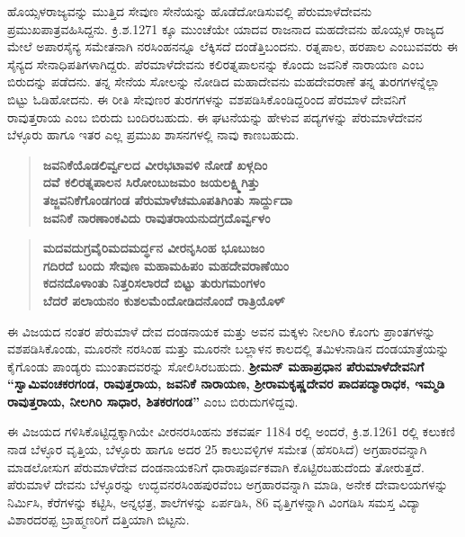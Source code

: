 ಹೊಯ್ಸಳರಾಜ್ಯವನ್ನು ಮುತ್ತಿದ ಸೇವುಣ ಸೇನೆಯನ್ನು ಹೊಡೆದೋಡಿಸುವಲ್ಲಿ ಪೆರುಮಾಳೆದೇವನು ಪ್ರಮುಖಪಾತ್ರ\-ವಹಿಸಿದ್ದನು. ಕ್ರಿ.ಶ.1271 ಕ್ಕೂ ಮುಂಚೆಯೇ ಯಾದವ ರಾಜನಾದ ಮಹದೇವನು ಹೊಯ್ಸಳ ರಾಜ್ಯದ ಮೇಲೆ ಅಪಾರಸೈನ್ಯ ಸಮೇತನಾಗಿ ನರಸಿಂಹನನ್ನೂ ಲೆಕ್ಕಿಸದೆ ದಂಡೆತ್ತಿಬಂದನು. ರತ್ನಪಾಲ, ಹರಪಾಲ ಎಂಬುವವರು ಈ ಸೈನ್ಯದ ಸೇನಾಧಿಪತಿ\-ಗಳಾಗಿದ್ದರು. ಪೆರಮಾಳೆದೇವನು ಕಲಿರತ್ನಪಾಲನನ್ನು ಕೊಂದು ಜವನಿಕೆ ನಾರಾಯಣ ಎಂಬ ಬಿರುದನ್ನು ಪಡೆದನು. ತನ್ನ ಸೇನೆಯ ಸೋಲನ್ನು ನೋಡಿದ ಮಹಾದೇವನು ಮಹದೇವರಾಣೆ ತನ್ನ ತುರಗಗಳನ್ನೆಲ್ಲಾ ಬಿಟ್ಟು ಓಡಿಹೋದನು. ಈ ರೀತಿ ಸೇವುಣರ ತುರಗಗಳನ್ನು ವಶಪಡಿಸಿಕೊಂಡಿದ್ದರಿಂದ ಪೆರಮಾಳೆ ದೇವನಿಗೆ ರಾವುತ್ತರಾಯ ಎಂಬ ಬಿರುದು ಬಂದಿರಬಹುದು. ಈ ಘಟನೆಯನ್ನು ಹೇಳುವ ಪದ್ಯಗಳನ್ನು ಪೆರುಮಾಳೆದೇವನ ಬೆಳ್ಳೂರು ಹಾಗೂ ಇತರ ಎಲ್ಲ ಪ್ರಮುಖ ಶಾಸನಗಳಲ್ಲಿ ನಾವು ಕಾಣಬಹುದು.

\begin{verse}
\textbf{ಜವನಿಕೆಯೊಡಲಿರ್ವ್ವಲದ ವೀರಭಟಾವಳಿ ನೋಡೆ ಖಳ್ಗದಿಂ} \\\textbf{ದವೆ ಕಲಿರತ್ನಪಾಲನ ಸಿರೋಂಬುಜಮಂ ಜಯಲಕ್ಷ್ಮಿಗಿತ್ತು} \\\textbf{ತಜ್ಜವನಿಕೆಗೊಂಡಗಂಡ ಪೆರುಮಾಳೆಚಮೂಪತಿಗಿಂತು ಸಾರ್ದ್ದುದಾ} \\\textbf{ಜವನಿಕೆ ನಾರಣಾಂಕವಿದು ರಾವುತರಾಯನುದಗ್ರದೊರ್ವ್ವಳಂ}
\end{verse}

\begin{verse}
\textbf{ಮದವದುಗ್ರವೈರಿಮದಮರ್ದ್ಧನ ವೀರನೃಸಿಂಹ ಭೂಬುಜಂ} \\\textbf{ಗದಿರದೆ ಬಂದು ಸೇವುಣ ಮಹಾಮಹಿಪಂ ಮಹದೇವರಾಣೆಯಿಂ} \\\textbf{ಕದನದೊಳಾಂತು ನಿತ್ತರಿಸಲಾರದೆ ಬಿಟ್ಟು ತುರುಗಮಂಗಳಂ} \\\textbf{ಬೆದರೆ ಪಲಾಯನಂ ಕುಶಲಮೆಂದೋಡಿದನೊಂದೆ ರಾತ್ರಿಯೊಳ್​}
\end{verse}

ಈ ವಿಜಯದ ನಂತರ ಪೆರುಮಾಳೆ ದೇವ ದಂಡನಾಯಕ ಮತ್ತು ಅವನ ಮಕ್ಕಳು ನೀಲಗಿರಿ ಕೊಂಗು ಪ್ರಾಂತಗಳನ್ನು ವಶಪಡಿಸಿಕೊಂಡು, ಮೂರನೇ ನರಸಿಂಹ ಮತ್ತು ಮೂರನೇ ಬಲ್ಲಾಳನ ಕಾಲದಲ್ಲಿ ತಮಿಳುನಾಡಿನ ದಂಡಯಾತ್ರೆಯನ್ನು ಕೈಗೊಂಡು ಪಾಂಡ್ಯರು ಮುಂತಾದವರನ್ನು ಸೋಲಿಸಿರಬಹುದು. \textbf{ಶ‍್ರೀಮನ್​ ಮಹಾಪ್ರಧಾನ ಪೆರುಮಾಳೆದೇವನಿಗೆ “ಸ್ವಾಮಿವಂಚಕರಗಂಡ, ರಾವುತ್ತರಾಯ, ಜವನಿಕೆ ನಾರಾಯಣ, ಶ‍್ರೀರಾಮಕೃಷ್ಣದೇವರ ಪಾದಪದ್ಮಾರಾಧಕ, ಇಮ್ಮಡಿ ರಾವುತ್ತರಾಯ, ನೀಲಗಿರಿ ಸಾಧಾರ, ಶಿತಕರಗಂಡ”} ಎಂಬ ಬಿರುದುಗಳಿದ್ದವು.

ಈ ವಿಜಯದ ಗಳಿಸಿಕೊಟ್ಟಿದ್ದಕ್ಕಾಗಿಯೇ ವೀರನರಸಿಂಹನು ಶಕವರ್ಷ 1184 ರಲ್ಲಿ ಅಂದರೆ, ಕ್ರಿ.ಶ.1261 ರಲ್ಲಿ ಕಲುಕಣಿ ನಾಡ ಬೆಳ್ಳೂರ ವೃತ್ತಿಯ, ಬೆಳ್ಳೂರು ಹಾಗೂ ಅದರ 25 ಕಾಲುವಳ್ಳಿಗಳ ಸಮೇತ (ಹೆಸರಿಸಿದೆ) ಅಗ್ರಹಾರವನ್ನಾಗಿ ಮಾಡಲೋಸುಗ ಪೆರುಮಾಳೆದೇವ ದಂಡನಾಯಕನಿಗೆ ಧಾರಾಪೂರ್ವಕವಾಗಿ ಕೊಟ್ಟಿರಬಹುದೆಂದು ತೋರುತ್ತದೆ. ಪೆರುಮಾಳೆ ದೇವನು ಬೆಳ್ಳೂರನ್ನು ಉದ್ಭವನರಸಿಂಹಪುರವೆಂಬ ಅಗ್ರಹಾರವನ್ನಾಗಿ ಮಾಡಿ, ಅನೇಕ ದೇವಾಲಯಗಳನ್ನು ನಿರ್ಮಿಸಿ, ಕೆರೆಗಳನ್ನು ಕಟ್ಟಿಸಿ, ಅನ್ನಛತ್ರ, ಶಾಲೆಗಳನ್ನು ಏರ್ಪಡಿಸಿ, 86 ವೃತ್ತಿಗಳನ್ನಾಗಿ ವಿಂಗಡಿಸಿ ಸಮಸ್ತ ವಿದ್ಯಾ ವಿಶಾರದರಪ್ಪ ಬ್ರಾಹ್ಮಣರಿಗೆ ದತ್ತಿಯಾಗಿ ಬಿಟ್ಟನು.

